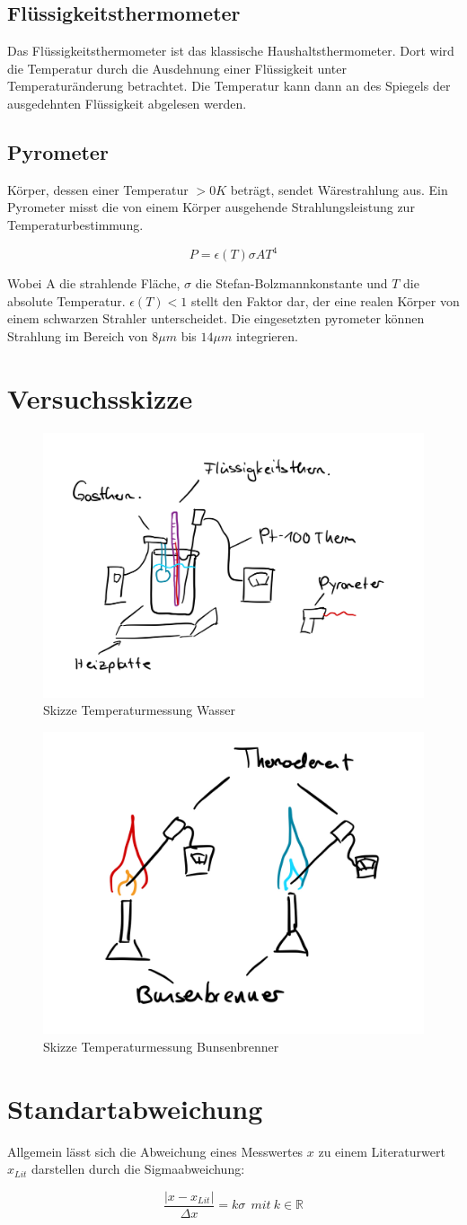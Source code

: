 \subsection{Flüssigkeitsthermometer}
Das Flüssigkeitsthermometer ist das klassische Haushaltsthermometer. Dort wird die Temperatur durch die
Ausdehnung einer Flüssigkeit unter Temperaturänderung betrachtet. Die Temperatur kann dann an des Spiegels der ausgedehnten Flüssigkeit abgelesen werden.

\subsection{Pyrometer}
Körper, dessen einer Temperatur $>0K$ beträgt, sendet Wärestrahlung aus.
Ein Pyrometer misst die von einem Körper ausgehende Strahlungsleistung zur Temperaturbestimmung.

\begin{equation}
    P = \epsilon(T) \sigma A T^4
\end{equation}

Wobei A die strahlende Fläche, $\sigma$ die Stefan-Bolzmannkonstante und $T$ die absolute Temperatur.
$\epsilon(T) < 1$ stellt den Faktor dar, der eine realen Körper von einem schwarzen Strahler unterscheidet.
Die eingesetzten pyrometer können Strahlung im Bereich von $8 \mu m$ bis $14 \mu m$ integrieren.

\newpage
\section{Versuchsskizze}
\begin{figure}[h!]
    \centering
    \includegraphics[width=.5\textwidth]{41Skizze.jpeg}
    \caption{Skizze Temperaturmessung Wasser}
\end{figure}
\begin{figure}[h!]
    \centering
    \includegraphics[width=.5\textwidth]{41Theroel.jpeg}
    \caption{Skizze Temperaturmessung Bunsenbrenner}
\end{figure}

\section{Standartabweichung}
Allgemein lässt sich die Abweichung eines Messwertes $x$ zu einem Literaturwert $x_{Lit}$ darstellen durch die Sigmaabweichung:

\begin{equation}
    \frac{|x-x_{Lit}|}{\Delta x} = k \sigma \ \ mit \ k \in \mathbb{R}
    \label{eq:sigma}
\end{equation}
